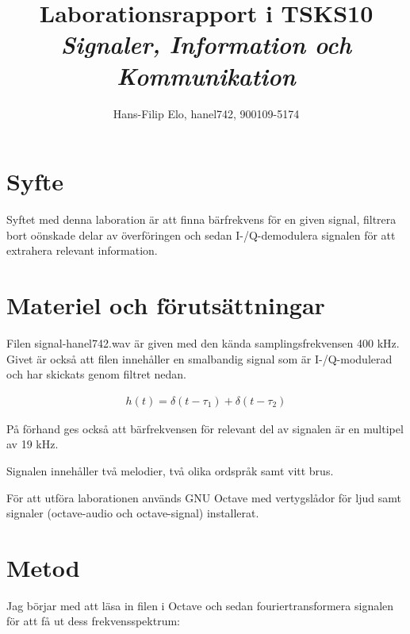 \documentclass[10pt,twocolumn]{article}
\title{Laborationsrapport i TSKS10 \emph{Signaler, Information och Kommunikation}}
\author{Hans-Filip Elo, hanel742, 900109-5174}
\begin{document}
\maketitle

\section{Syfte}

Syftet med denna laboration är att finna bärfrekvens för en given signal, filtrera bort oönskade delar av överföringen och sedan I-/Q-demodulera signalen för att extrahera relevant information. 

\section{Materiel och förutsättningar}

Filen signal-hanel742.wav är given med den kända samplingsfrekvensen 400 kHz. Givet är också att filen innehåller en smalbandig signal som är I-/Q-modulerad och har skickats genom filtret nedan. 

\begin{gather}
h(t) = \delta(t - \tau_1) + \delta(t - \tau_2)
\label{equ:filter}
\end{gather}

På förhand ges också att bärfrekvensen för relevant del av signalen är en multipel av 19 kHz.

Signalen innehåller två melodier, två olika ordspråk samt vitt brus. 

För att utföra laborationen används GNU Octave med vertygslådor för ljud samt signaler (octave-audio och octave-signal) installerat. 

\section{Metod}

Jag börjar med att läsa in filen i Octave och sedan fouriertransformera signalen för att få ut dess frekvensspektrum: 
\end{document}
